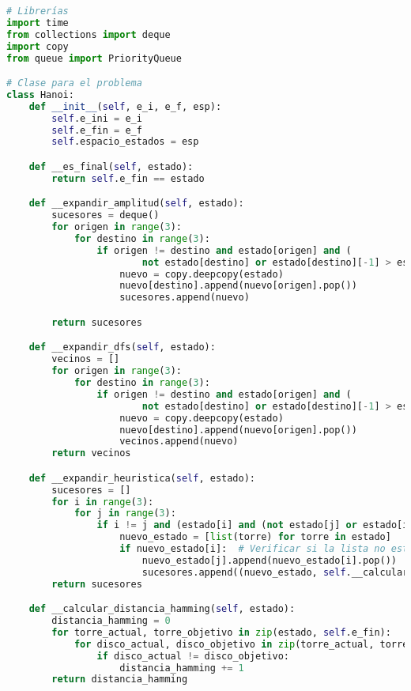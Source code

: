 \documentclass{article}
\begin{document}
\begin{lstlisting}[language=Python]
# Librerías
import time
from collections import deque
import copy
from queue import PriorityQueue

# Clase para el problema
class Hanoi:
    def __init__(self, e_i, e_f, esp):
        self.e_ini = e_i
        self.e_fin = e_f
        self.espacio_estados = esp

    def __es_final(self, estado):
        return self.e_fin == estado

    def __expandir_amplitud(self, estado):
        sucesores = deque()
        for origen in range(3):
            for destino in range(3):
                if origen != destino and estado[origen] and (
                        not estado[destino] or estado[destino][-1] > estado[origen][-1]):
                    nuevo = copy.deepcopy(estado)
                    nuevo[destino].append(nuevo[origen].pop())
                    sucesores.append(nuevo)

        return sucesores

    def __expandir_dfs(self, estado):
        vecinos = []
        for origen in range(3):
            for destino in range(3):
                if origen != destino and estado[origen] and (
                        not estado[destino] or estado[destino][-1] > estado[origen][-1]):
                    nuevo = copy.deepcopy(estado)
                    nuevo[destino].append(nuevo[origen].pop())
                    vecinos.append(nuevo)
        return vecinos

    def __expandir_heuristica(self, estado):
        sucesores = []
        for i in range(3):
            for j in range(3):
                if i != j and (estado[i] and (not estado[j] or estado[i][-1] < estado[j][-1])):
                    nuevo_estado = [list(torre) for torre in estado]
                    if nuevo_estado[i]:  # Verificar si la lista no está vacía antes de llamar a pop()
                        nuevo_estado[j].append(nuevo_estado[i].pop())
                        sucesores.append((nuevo_estado, self.__calcular_distancia_hamming(nuevo_estado)))
        return sucesores

    def __calcular_distancia_hamming(self, estado):
        distancia_hamming = 0
        for torre_actual, torre_objetivo in zip(estado, self.e_fin):
            for disco_actual, disco_objetivo in zip(torre_actual, torre_objetivo):
                if disco_actual != disco_objetivo:
                    distancia_hamming += 1
        return distancia_hamming


\end{lstlisting}
\end{document}
